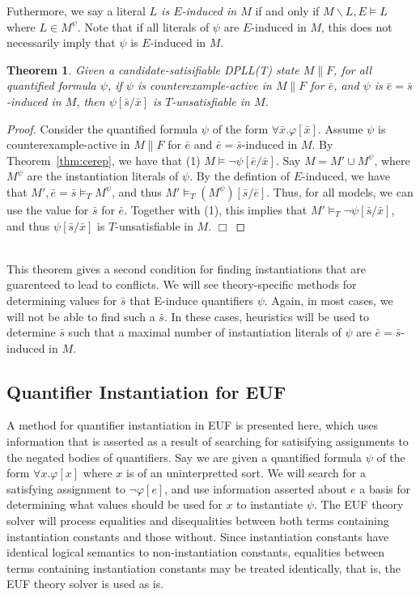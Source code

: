 \documentclass{llncs}
\newtheorem{thm}{Theorem}
\begin{document}
Futhermore, we say a literal \emph{$L$ is $E$-induced in $M$} if and only if $M \backslash L, E \models L$ where $L \in M^\psi$.
Note that if all literals of $\psi$ are $E$-induced in $M$, this does not necessarily imply that $\psi$ is $E$-induced in $M$.

\begin{thm}
\label{thm:einduce}
Given a candidate-satisifiable DPLL(T) state $M \parallel F$, for all quantified formula $\psi$, if $\psi$ is counterexample-active in $M \parallel F$ for $\bar{e}$, and $\psi$ is $\bar{e} = \bar{s}$-induced in $M$, then $\psi[\bar{s}/\bar{x}]$ is $T$-unsatisfiable in $M$.
\end{thm}
\begin{proof}
Consider the quantified formula $\psi$ of the form $\forall \bar{x}. \varphi[ \bar{x} ]$.
Assume $\psi$ is counterexample-active in $M \parallel F$ for $\bar{e}$ and $\bar{e}=\bar{s}$-induced in $M$.
By Theorem~\ref{thm:cerep}, we have that (1) $M \models \neg \psi[\bar{e}/\bar{x}]$.
Say $M = M' \cup M^\psi$, where $M^\psi$ are the instantiation literals of $\psi$.
By the defintion of $E$-induced, we have that $M', \bar{e}=\bar{s} \models_T M^\psi$, and thus $M' \models_T (M^\psi)[\bar{s}/\bar{e}]$.
Thus, for all models, we can use the value for $\bar{s}$ for $\bar{e}$.
Together with (1), this implies that $M' \models_T \neg \psi[\bar{s}/\bar{x}]$, and thus $\psi[\bar{s}/\bar{x}]$ is $T$-unsatisfiable in $M$.
$\Box$
\end{proof}

\ \\ 

This theorem gives a second condition for finding instantiations that are guarenteed to lead to conflicts.
We will see theory-specific methods for determining values for $\bar{s}$ that E-induce quantifiers $\psi$.
Again, in most cases, we will not be able to find such a $\bar{s}$.
In these cases, heuristics will be used to determine $\bar{s}$ such that a maximal number of instantiation literals of $\psi$ are $\bar{e} = \bar{s}$-induced in $M$.

\subsection{Quantifier Instantiation for EUF}

A method for quantifier instantiation in EUF is presented here, which uses information that is asserted as a result of searching for satisifying assignments to the negated bodies of quantifiers.
Say we are given a quantified formula $\psi$ of the form $\forall x. \varphi[x]$ where $x$ is of an uninterpretted sort.
We will search for a satisfying assignment to $\neg \varphi[e]$, and use information asserted about $e$ a basis for determining what values should be used for $x$ to instantiate $\psi$.
The EUF theory solver will process equalities and disequalities between both terms containing instantiation constants and those without.
Since instantiation constants have identical logical semantics to non-instantiation constants, equalities between terms containing instantiation constants may be treated identically, that is, the EUF theory solver is used as is.
\end{document}
